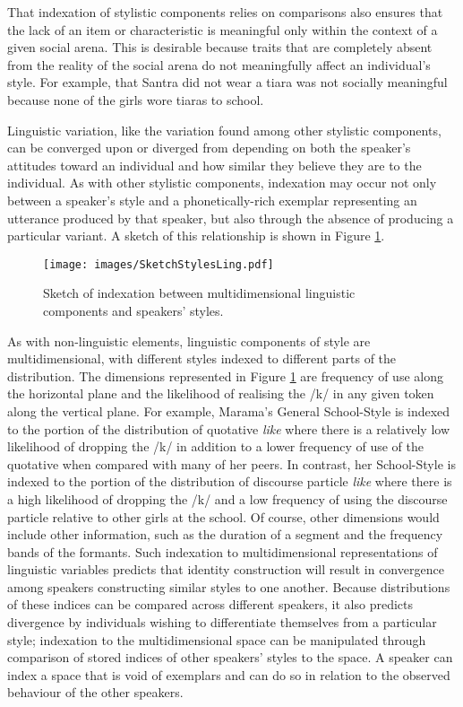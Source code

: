 That indexation of stylistic components relies on comparisons also ensures that the lack of an item or characteristic is meaningful only within the context of a given social arena.  This is desirable because traits that are completely absent from the reality of the social arena do not meaningfully affect an individual's style.  For example, that Santra did not wear a tiara was not socially meaningful because none of the girls wore tiaras to school.  

Linguistic variation, like the variation found among other stylistic components, can be converged upon or diverged from depending on both the speaker's attitudes toward an individual and how similar they believe they are to the individual.  As with other stylistic components, indexation may occur not only between a speaker's style and a phonetically-rich exemplar representing an utterance produced by that speaker, but also through the absence of producing a particular variant.  A sketch of this relationship is shown in Figure \ref{fig:SketchStylesLing}.  

\begin{figure}
	\centering
		\texttt{[image: images/SketchStylesLing.pdf]}
	\caption{Sketch of indexation between multidimensional linguistic components and speakers' styles.}
	\label{fig:SketchStylesLing}
\end{figure}


As with non-linguistic elements, linguistic components of style are multidimensional, with different styles indexed to different parts of the distribution.  The dimensions represented in Figure \ref{fig:SketchStylesLing} are frequency of use along the horizontal plane and the likelihood of realising the /k/ in any given token along the vertical plane. For example, Marama's General School-Style is indexed to the portion of the distribution of quotative \textit{like} where there is a relatively low likelihood of dropping the /k/ in addition to a lower frequency of use of the quotative when compared with many of her peers.  In contrast, her School-Style is indexed to the portion of the distribution of discourse particle \textit{like} where there is a high likelihood of dropping the /k/ and a low frequency of using the discourse particle relative to other girls at the school.  Of course, other dimensions would include other information, such as the duration of a segment and the frequency bands of the formants.  Such indexation to multidimensional representations of linguistic variables predicts that identity construction will result in convergence among speakers constructing similar styles to one another.  Because distributions of these indices can be compared across different speakers, it also predicts divergence by individuals wishing to differentiate themselves from a particular style; indexation to the multidimensional space can be manipulated through comparison of stored indices of other speakers' styles to the space.  A speaker can index a space that is void of exemplars and can do so in relation to the observed behaviour of the other speakers.

